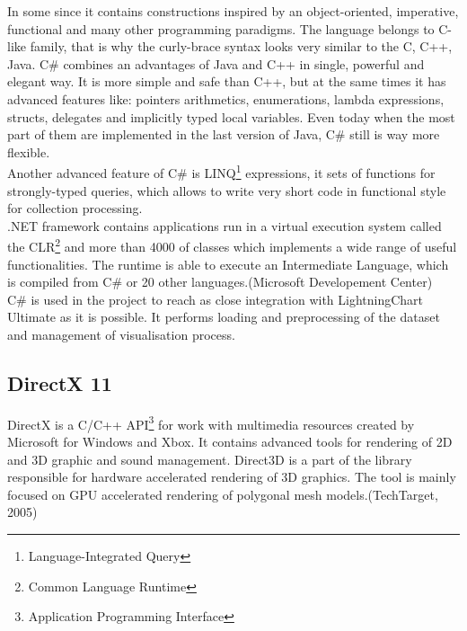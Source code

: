 \documentclass[twoside, english, 11pt]{report}
\begin{document}
In some since it contains constructions inspired by an object-oriented, imperative, functional and many other programming paradigms. The language belongs to C-like family, that is why the curly-brace syntax looks very similar to the C, C++, Java. C\# combines an advantages of Java and C++ in single, powerful and elegant way. It is more simple and safe than C++, but at the same times it has advanced features like: pointers arithmetics, enumerations, lambda expressions, structs, delegates and implicitly typed local variables. Even today when the most part of them are implemented in the last version of Java, C\# still is way more flexible.\\

Another advanced feature of C\# is  LINQ\footnote{Language-Integrated Query} expressions, it sets of functions for strongly-typed queries, which allows to write very short code in functional style for collection processing.\\

.NET framework contains applications run in a virtual execution system called the CLR\footnote{Common Language Runtime} and more than 4000 of classes which implements a wide range of useful functionalities. The runtime is able to execute an Intermediate Language, which is compiled from C\# or 20 other languages.(Microsoft Developement Center)\\

C\# is used in the project to reach as close integration with LightningChart Ultimate as it is possible. It performs loading and preprocessing of the dataset and management of visualisation process.

\subsection{DirectX 11}
DirectX is a C/C++ API\footnote{Application Programming Interface} for work with multimedia resources created by Microsoft for Windows and Xbox. It contains advanced tools for rendering of 2D and 3D graphic and sound management. Direct3D is a part of the library responsible for hardware accelerated rendering of 3D graphics. The tool is mainly focused on GPU accelerated rendering of polygonal mesh models.(TechTarget, 2005)\\
\end{document}
